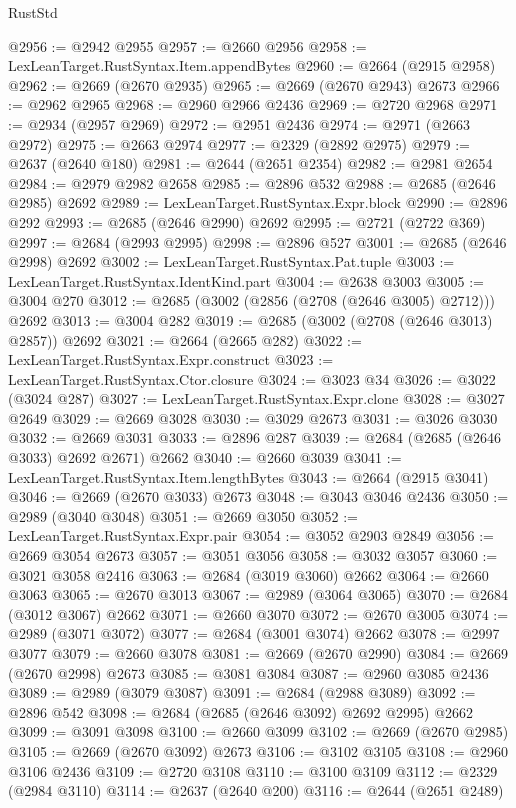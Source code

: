 \begin{lexlean}{RustStd}
\begin{coremodule}
@2956 := @2942 @2955
@2957 := @2660 @2956
@2958 := LexLeanTarget.RustSyntax.Item.appendBytes
@2960 := @2664 (@2915 @2958)
@2962 := @2669 (@2670 @2935)
@2965 := @2669 (@2670 @2943) @2673
@2966 := @2962 @2965
@2968 := @2960 @2966 @2436
@2969 := @2720 @2968
@2971 := @2934 (@2957 @2969)
@2972 := @2951 @2436
@2974 := @2971 (@2663 @2972)
@2975 := @2663 @2974
@2977 := @2329 (@2892 @2975)
@2979 := @2637 (@2640 @180)
@2981 := @2644 (@2651 @2354)
@2982 := @2981 @2654
@2984 := @2979 @2982 @2658
@2985 := @2896 @532
@2988 := @2685 (@2646 @2985) @2692
@2989 := LexLeanTarget.RustSyntax.Expr.block
@2990 := @2896 @292
@2993 := @2685 (@2646 @2990) @2692
@2995 := @2721 (@2722 @369)
@2997 := @2684 (@2993 @2995)
@2998 := @2896 @527
@3001 := @2685 (@2646 @2998) @2692
@3002 := LexLeanTarget.RustSyntax.Pat.tuple
@3003 := LexLeanTarget.RustSyntax.IdentKind.part
@3004 := @2638 @3003
@3005 := @3004 @270
@3012 := @2685 (@3002 (@2856 (@2708 (@2646 @3005) @2712))) @2692
@3013 := @3004 @282
@3019 := @2685 (@3002 (@2708 (@2646 @3013) @2857)) @2692
@3021 := @2664 (@2665 @282)
@3022 := LexLeanTarget.RustSyntax.Expr.construct
@3023 := LexLeanTarget.RustSyntax.Ctor.closure
@3024 := @3023 @34
@3026 := @3022 (@3024 @287)
@3027 := LexLeanTarget.RustSyntax.Expr.clone
@3028 := @3027 @2649
@3029 := @2669 @3028
@3030 := @3029 @2673
@3031 := @3026 @3030
@3032 := @2669 @3031
@3033 := @2896 @287
@3039 := @2684 (@2685 (@2646 @3033) @2692 @2671) @2662
@3040 := @2660 @3039
@3041 := LexLeanTarget.RustSyntax.Item.lengthBytes
@3043 := @2664 (@2915 @3041)
@3046 := @2669 (@2670 @3033) @2673
@3048 := @3043 @3046 @2436
@3050 := @2989 (@3040 @3048)
@3051 := @2669 @3050
@3052 := LexLeanTarget.RustSyntax.Expr.pair
@3054 := @3052 @2903 @2849
@3056 := @2669 @3054 @2673
@3057 := @3051 @3056
@3058 := @3032 @3057
@3060 := @3021 @3058 @2416
@3063 := @2684 (@3019 @3060) @2662
@3064 := @2660 @3063
@3065 := @2670 @3013
@3067 := @2989 (@3064 @3065)
@3070 := @2684 (@3012 @3067) @2662
@3071 := @2660 @3070
@3072 := @2670 @3005
@3074 := @2989 (@3071 @3072)
@3077 := @2684 (@3001 @3074) @2662
@3078 := @2997 @3077
@3079 := @2660 @3078
@3081 := @2669 (@2670 @2990)
@3084 := @2669 (@2670 @2998) @2673
@3085 := @3081 @3084
@3087 := @2960 @3085 @2436
@3089 := @2989 (@3079 @3087)
@3091 := @2684 (@2988 @3089)
@3092 := @2896 @542
@3098 := @2684 (@2685 (@2646 @3092) @2692 @2995) @2662
@3099 := @3091 @3098
@3100 := @2660 @3099
@3102 := @2669 (@2670 @2985)
@3105 := @2669 (@2670 @3092) @2673
@3106 := @3102 @3105
@3108 := @2960 @3106 @2436
@3109 := @2720 @3108
@3110 := @3100 @3109
@3112 := @2329 (@2984 @3110)
@3114 := @2637 (@2640 @200)
@3116 := @2644 (@2651 @2489)

\end{coremodule}
\end{lexlean}
